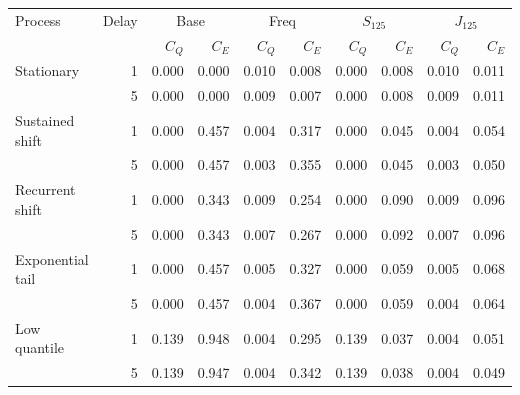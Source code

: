 \begin{tabular}{lrrrrrrrrr}
\toprule
Process & Delay & \multicolumn{2}{c}{Base} & \multicolumn{2}{c}{Freq} & \multicolumn{2}{c}{$S_{125}$} & \multicolumn{2}{c}{$J_{125}$} \\
 & & $C_Q$ & $C_E$ & $C_Q$ & $C_E$ & $C_Q$ & $C_E$ & $C_Q$ & $C_E$ \\
\midrule
Stationary & 1 & 0.000 & 0.000 & 0.010 & 0.008 & 0.000 & 0.008 & 0.010 & 0.011 \\
 & 5 & 0.000 & 0.000 & 0.009 & 0.007 & 0.000 & 0.008 & 0.009 & 0.011 \\
Sustained shift & 1 & 0.000 & 0.457 & 0.004 & 0.317 & 0.000 & 0.045 & 0.004 & 0.054 \\
 & 5 & 0.000 & 0.457 & 0.003 & 0.355 & 0.000 & 0.045 & 0.003 & 0.050 \\
Recurrent shift & 1 & 0.000 & 0.343 & 0.009 & 0.254 & 0.000 & 0.090 & 0.009 & 0.096 \\
 & 5 & 0.000 & 0.343 & 0.007 & 0.267 & 0.000 & 0.092 & 0.007 & 0.096 \\
Exponential tail & 1 & 0.000 & 0.457 & 0.005 & 0.327 & 0.000 & 0.059 & 0.005 & 0.068 \\
 & 5 & 0.000 & 0.457 & 0.004 & 0.367 & 0.000 & 0.059 & 0.004 & 0.064 \\
Low quantile & 1 & 0.139 & 0.948 & 0.004 & 0.295 & 0.139 & 0.037 & 0.004 & 0.051 \\
 & 5 & 0.139 & 0.947 & 0.004 & 0.342 & 0.139 & 0.038 & 0.004 & 0.049 \\
\bottomrule
\end{tabular}
